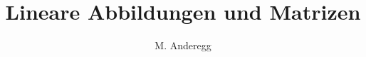 \documentclass[a4paper, 11pt]{article}
\begin{document}
\title{Lineare Abbildungen und Matrizen}
\author{M. Anderegg}
\date{} %
\maketitle 


\clearpage

    \clearpage
    
\clearpage

\clearpage

\clearpage

\end{document}
